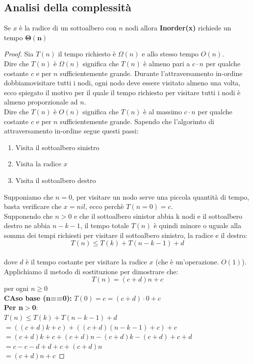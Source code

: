 \subsection{Analisi della complessità}
\colorbox{SALZO}{\parbox{\dimexpr\linewidth-2\fboxsep}{\begin{theorem}
Se $x$ è la radice di un sottoalbero con $n$ nodi allora \textbf{Inorder(x)} richiede un tempo $\mathbf{\Theta(n)}$
\end{theorem}}}
\begin{proof}
Sia $T(n)$ il tempo richiesto è $\Omega(n)$ e allo stesso tempo $O(n)$.\\
Dire che $T(n)$ è $\Omega(n)$ significa che $T(n)$ è almeno pari a $c \cdot n$ per qualche costante $c$ e per $n$ 
sufficientemente grande. Durante l'attraversamento in-ordine dobbiamovisitare tutti i nodi, ogni nodo deve essere 
visitato almeno una volta, ecco spiegato il motivo per il quale il tempo richiesto per visitare tutti i nodi è almeno proporzionale ad $n$.\\
Dire che $T(n)$ è $O(n)$ significa che $T(n)$ è al massimo $c \cdot n$ per qualche costante $c$ e per $n$ sufficientemente grande. Sapendo che l'algorimto 
di attraversamento in-ordine segue questi passi:
\begin{enumerate}
    \item Visita il sottoalbero sinistro
    \item Visita la radice $x$
    \item Visita il sottoalbero destro
\end{enumerate}
\noindent Supponiamo che $n=0$, per visitare un nodo serve una piccola quantità di tempo, basta verificare che $x=nil$, ecco perchè $T(n=0)=c$.\\
Supponendo che $n>0$ e che il sottoalbero sinistor abbia k nodi e il sottoalbero destro ne abbia $n-k-1$, il tempo totale $T(n)$ è quindi minore o uguale alla somma 
dei tempi richiesti per visitare il sottoalbero sinistro, la radice e il destro:\\
$$T(n) \le T(k) + T(n-k-1)+d $$\\
dove $d$ è il tempo costante per visitare la radice $x$ (che è un'operazione. $O(1)$). Applichiamo il metodo di sostituzione per dimostrare che:\\
$$T(n)=(c+d)n+c$$ per ogni $n \ge 0$\\
\textbf{CAso base (n==0):} $T(0)=c=(c+d) \cdot 0 + c$\\
\textbf{Per n$>$0}:\\
$T(n) \le T(k) + T(n-k-1)+d$
$=((c+d)k+c)+((c+d)(n-k-1)+c)+c$\\
$=(c+ d)k+ c+ (c+ d)n-(c+ d)k-(c+ d) + c+ d$\\
$= c-c-d+ d+ c+ (c+ d)n$\\
$= (c+ d)n+ c$
\end{proof}
